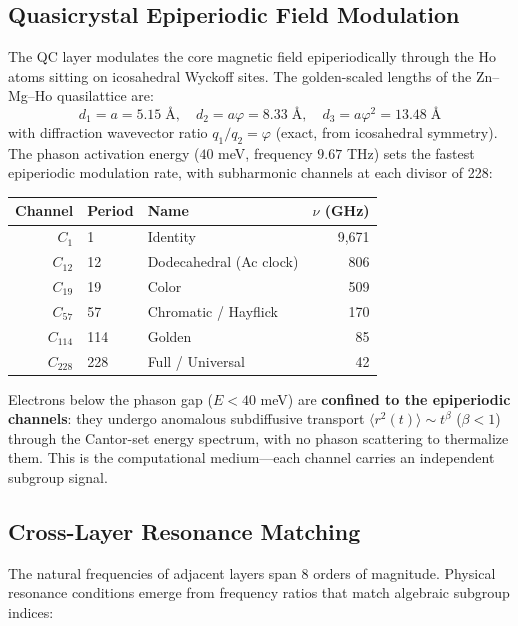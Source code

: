 \subsection{Quasicrystal Epiperiodic Field Modulation}

The QC layer modulates the core magnetic field epiperiodically through the Ho atoms sitting on icosahedral Wyckoff sites. The golden-scaled lengths of the Zn--Mg--Ho quasilattice are:
\begin{equation}
    d_1 = a = 5.15 \;\text{\AA}, \quad d_2 = a\varphi = 8.33 \;\text{\AA}, \quad d_3 = a\varphi^2 = 13.48 \;\text{\AA}
\end{equation}
with diffraction wavevector ratio $q_1/q_2 = \varphi$ (exact, from icosahedral symmetry). The phason activation energy ($40$ meV, frequency $9.67$ THz) sets the fastest epiperiodic modulation rate, with subharmonic channels at each divisor of 228:

\begin{center}
{%
\begin{tabular}{@{}rllr@{}}
\toprule
\textbf{Channel} & \textbf{Period} & \textbf{Name} & $\nu$ (GHz) \\
\midrule
$C_1$ & 1 & Identity & 9{,}671 \\
$C_{12}$ & 12 & Dodecahedral (Ac clock) & 806 \\
$C_{19}$ & 19 & Color & 509 \\
$C_{57}$ & 57 & Chromatic / Hayflick & 170 \\
$C_{114}$ & 114 & Golden & 85 \\
$C_{228}$ & 228 & Full / Universal & 42 \\
\bottomrule
\end{tabular}
}
\end{center}

\noindent Electrons below the phason gap ($E < 40$ meV) are \textbf{confined to the epiperiodic channels}: they undergo anomalous subdiffusive transport $\langle r^2(t) \rangle \sim t^\beta$ ($\beta < 1$) through the Cantor-set energy spectrum, with no phason scattering to thermalize them. This is the computational medium---each channel carries an independent subgroup signal.

\subsection{Cross-Layer Resonance Matching}

The natural frequencies of adjacent layers span 8 orders of magnitude. Physical resonance conditions emerge from frequency ratios that match algebraic subgroup indices:

